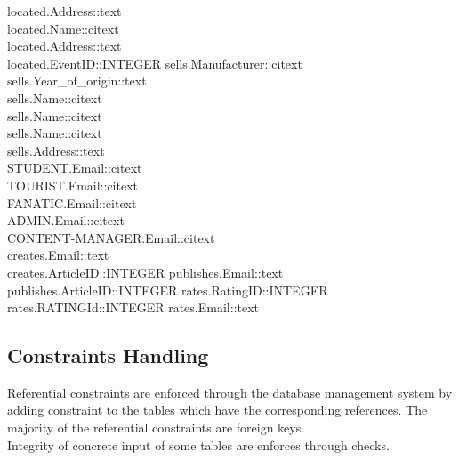 located.Address::text\\
located.Name::citext\\
located.Address::text\\
located.EventID::INTEGER
sells.Manufacturer::citext\\
sells.Year\_of\_origin::text\\
sells.Name::citext\\
sells.Name::citext\\
sells.Name::citext\\
sells.Address::text\\
STUDENT.Email::citext\\
TOURIST.Email::citext\\
FANATIC.Email::citext\\
ADMIN.Email::citext\\
CONTENT-MANAGER.Email::citext\\
creates.Email::text\\
creates.ArticleID::INTEGER
publishes.Email::text\\
publishes.ArticleID::INTEGER
rates.RatingID::INTEGER
rates.RATINGId::INTEGER
rates.Email::text\\
\subsection{Constraints Handling}
Referential constraints are enforced through the database management system by adding constraint to the tables which have the corresponding references. The majority of the referential constraints are foreign keys.\\
Integrity of concrete input of some tables are enforces through checks.\\
\newpage